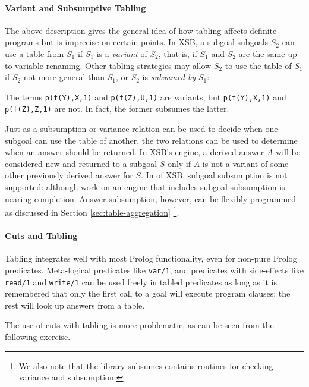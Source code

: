 \paragraph*{Variant and Subsumptive Tabling}
The above description gives the general idea of how tabling affects
definite programs but is imprecise on certain points.  In XSB, a
subgoal subgoals $S_2$ can use a table from $S_1$ if $S_1$ is a {\em
variant} of $S_2$, that is, if $S_1$ and $S_2$ are the same up to
variable renaming.  Other tabling strategies may allow $S_2$ to use
the table of $S_1$ if $S_2$ not more general than $S_1$, or $S_2$ is
{\em subsumed by} $S_1$:
\begin{example}
The terms {\tt p(f(Y),X,1)} and {\tt p(f(Z),U,1)} are variants, but
{\tt p(f(Y),X,1)} and {\tt p(f(Z),Z,1)} are not.  In fact, the former
subsumes the latter.
\end{example}
Just as a subsumption or variance relation can be used to decide when
one subgoal can use the table of another, the two relations can be
used to determine when an answer should be returned.  In XSB's engine,
a derived answer $A$ will be considered new and returned to a subgoal
$S$ only if $A$ is not a variant of some other previously derived
answer for $S$.  In \version{} of XSB, subgoal subsumption is not
supported: although work on an engine that includes subgoal subsumption
is nearing completion.  Answer subsumption, however, can be flexibly
programmed as discussed in Section \ref{sec:table-aggregation}
\footnote{We also note that the library {\sf subsumes} contains
routines for checking variance and subsumption.}.

\paragraph{Cuts and Tabling} \label{sec:cuts}

Tabling integrates well with most Prolog functionality, even for
non-pure Prolog predicates.  Meta-logical predicates like {\tt var/1},
and predicates with side-effects like {\tt read/1} and {\tt write/1}
can be used freely in tabled predicates as long as it is remembered
that only the first call to a goal will execute program clauses: the
rest will look up answers from a table.  

The use of cuts with tabling is more problematic, as can be seen from
the following exercise.

